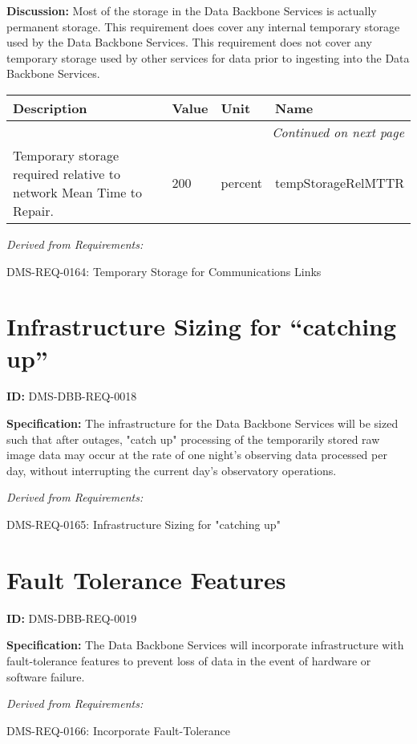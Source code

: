 \documentclass[SE,toc,lsstdraft]{lsstdoc}
\makeatletter
\newcommand{\paramname}[1]{\hspace{0pt}#1}
\newcommand{\unitname}[1]{\hspace{0pt}#1}
\newenvironment{parameters}[0]{%
\setlength\LTleft{0pt}
\setlength\LTright{\fill}
\begin{small}
\begin{longtable}[]{|p{0.49\textwidth}|l|p{0.6in}|p{1.70in}@{}|}

\hline \textbf{Description} & \textbf{Value} & \textbf{Unit} & \textbf{Name} \\ \hline
\endhead

\hline \multicolumn{4}{r}{\emph{Continued on next page}} \\
\endfoot

\hline\hline
\endlastfoot
}{%
\hline
\end{longtable}
\end{small}
}
\makeatother
\begin{document}
\textbf{Discussion:}
Most of the storage in the Data Backbone Services is actually permanent storage.    This requirement does cover any internal temporary storage used by the Data Backbone Services.   This requirement does not cover any temporary storage used by other services for data prior to ingesting into the Data Backbone Services.

\begin{parameters}
Temporary storage required relative to network Mean Time to Repair.
&
200
&
\unitname{%
percent
}
&
\paramname{%
tempStorageRelMTTR
} \\\hline
\end{parameters}

\emph{Derived from Requirements:}

DMS-REQ-0164:
Temporary Storage for Communications Links \newline

\section{Infrastructure Sizing for “catching up”}

\label{DMS-DBB-REQ-0018}
\textbf{ID:} DMS-DBB-REQ-0018

\textbf{Specification:}
The infrastructure for the Data Backbone Services will be sized such that after outages, "catch up" processing of the temporarily stored raw image data may occur at the rate of one night’s observing data processed per day, without interrupting the current day's observatory operations.

\emph{Derived from Requirements:}

DMS-REQ-0165:
Infrastructure Sizing for "catching up" \newline

\section{Fault Tolerance Features}

\label{DMS-DBB-REQ-0019}
\textbf{ID:} DMS-DBB-REQ-0019

\textbf{Specification:}
The Data Backbone Services will incorporate infrastructure with fault-tolerance features to prevent loss of data in the event of hardware or software failure.

\emph{Derived from Requirements:}

DMS-REQ-0166:
Incorporate Fault-Tolerance \newline
\end{document}
